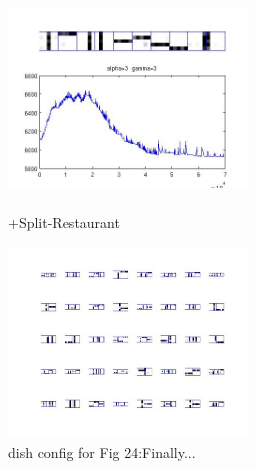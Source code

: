 \documentclass{article}
\begin{document}
\begin{spacing}{1.1}
\begin{figure}[h] 
  \begin{minipage}[b]{0.5\textwidth} 
    \centering 
    \includegraphics[width=2.5in,height=2in]{finald.jpg} 
    \caption{+Split-Restaurant}
    \label{fig:by:table} 
  \end{minipage}%
  \begin{minipage}[b]{0.5\textwidth} 
    \centering 
    \includegraphics[width=2.5in,height=2in]{final.jpg} 
    \caption{dish config for Fig 24:Finally...}
    \label{fig:by:table}  
   \end{minipage}%
\end{figure}


\end{spacing}
\end{document}
